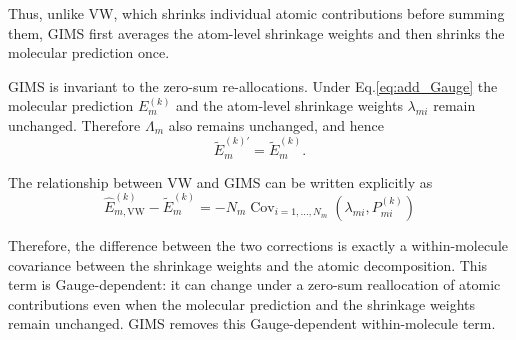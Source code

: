 \documentclass{article}
\begin{document}
Thus, unlike VW, which shrinks individual atomic contributions before
summing them, GIMS first averages the atom-level shrinkage weights and
then shrinks the molecular prediction once.

GIMS is invariant to the zero-sum re-allocations. Under Eq.\ref{eq:add_Gauge} the molecular prediction $E_m^{(k)}$ and the atom-level shrinkage weights $\lambda_{mi}$ remain unchanged. Therefore $\Lambda_m$ also remains unchanged, and hence
$$
\widetilde{E}_m^{(k)\prime}=\widetilde{E}_m^{(k)}.
$$

The relationship between VW and GIMS can be written explicitly as
\begin{equation}
    \hat{E}_{m,\mathrm{VW}}^{(k)}-\widetilde{E}_m^{(k)}=
-N_m\operatorname{Cov}_{i=1,\dots,N_m}\left(\lambda_{mi},P_{mi}^{(k)}\right)
\end{equation}

Therefore, the difference between the two corrections is exactly a within-molecule covariance between the shrinkage weights and the atomic decomposition. This term is Gauge-dependent: it can change under a zero-sum reallocation of atomic contributions even when the molecular prediction and the shrinkage weights remain unchanged. GIMS removes this Gauge-dependent within-molecule term.



\end{document}
